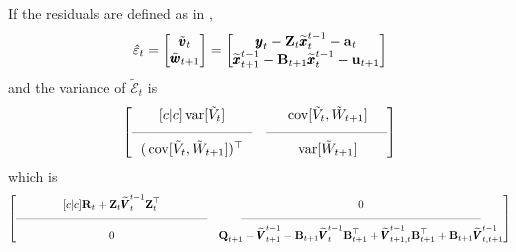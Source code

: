 \documentclass[]{article}
\def\UPS{\mbox{\boldmath $\Upsilon$}}
\def\XI{\mbox{\boldmath $\Xi$}}
\def\BB{\mbox{$\mathbf B$}}	\def\bb{\mbox{$\mathbf b$}} \def\Bb{\mbox{$\mathbf J$}} \def\Ba{\mbox{$\mathbf L$}} \def\Bm{\UPS}
\def\QQ{\mbox{$\mathbf Q$}}	 \def\qq{\mbox{$\mathbf q$}} \def\Qb{\mbox{$\mathbf G$}}  \def\Qm{\mathbb{Q}}
\def\RR{\mbox{$\mathbf R$}}	 \def\rr{\mbox{$\mathbf r$}} \def\Rb{\mbox{$\mathbf H$}}	\def\Rm{\mathbb{R}}
\def\VV{\mbox{$\pmb{V}$}}	\def\vv{\mbox{$\pmb{v}$}}
\def\ZZ{\mbox{$\mathbf Z$}}	\def\zz{\mbox{$\mathbf z$}}	\def\Zb{\mbox{$\mathbf M$}} \def\Za{\mbox{$\mathbf N$}} \def\Zm{\XI}
\def\var{\,\textup{\textrm{var}}}
\def\cov{\,\textup{\textrm{cov}}}
\def\hatxtt1{\widetilde{\xx}_t^{t-1}}
\def\hatxtpt1{\widetilde{\mbox{$\xx$}}_{t+1}^{t-1}}
\def\hatVtt1{\widetilde{\VV}_t^{t-1}}
\def\hatVttpt1{\widetilde{\VV}_{t,t+1}^{t-1}}
\def\hatVtptt1{\widetilde{\VV}_{t+1,t}^{t-1}}
\begin{document}
If the residuals are defined as in \citet{Harveyetal1998},
\begin{equation}
\hat{\varepsilon}_t = \begin{bmatrix}\tilde{\vv}_t\\ \tilde{\ww}_{t+1}\end{bmatrix} =
\begin{bmatrix}\yy_t - \ZZ_t\hatxtt1-\aa_t\\ \hatxtpt1 - \BB_{t+1}\hatxtt1-\uu_{t+1} \end{bmatrix}
\end{equation}
and the variance of $\tilde{\mathcal{E}}_t$ is
\begin{equation}
 \begin{bmatrix}[c|c]
 \var[\tilde{V}_t]&
 \cov[\tilde{V}_t, \tilde{W}_{t+1}] \\
 \rule[.5ex]{20ex}{0.25pt} & \rule[.5ex]{20ex}{0.25pt} \\
 (\cov[\tilde{V}_t, \tilde{W}_{t+1}])^\top& 
 \var[\tilde{W}_{t+1}] \end{bmatrix}
\end{equation}
which is
\begin{equation}\label{eqn:jointcondresid2.innov.t1}
\begin{bmatrix}[c|c]
\RR_t + \ZZ_t \hatVtt1 \ZZ_t^\top& 0 \\
\rule[.5ex]{40ex}{0.25pt} & \rule[.5ex]{50ex}{0.25pt} \\
0 & \QQ_{t+1} - \widetilde{\VV}_{t+1}^{t-1} - \BB_{t+1} \hatVtt1 \BB_{t+1}^\top + \hatVtptt1 \BB_{t+1}^\top + \BB_{t+1}\hatVttpt1 \end{bmatrix}
\end{equation}




\end{document}
